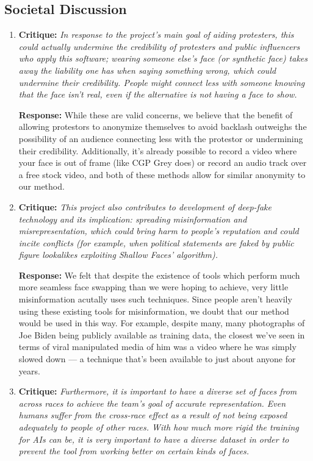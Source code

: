 \subsection{Societal Discussion}

\begin{enumerate}
    \item \textbf{Critique:} \textit{In response to the project’s main goal of aiding protesters, this could actually
    undermine the credibility of protesters and public influencers who apply this
    software; wearing someone else’s face (or synthetic face) takes away the liability
    one has when saying something wrong, which could undermine their credibility.
    People might connect less with someone knowing that the face isn’t real, even if
    the alternative is not having a face to show.}

    \textbf{Response:} While these are valid concerns, we believe that the benefit of allowing protestors to anonymize themselves
    to avoid backlash outweighs the possibility of an audience connecting less with the protestor or undermining their credibility. Additionally, it's already possible to record a video where your face is out of frame (like CGP Grey does) or record an audio track over a free stock video, and both of these methods allow for similar anonymity to our method.

    \item \textbf{Critique:} \textit{This project also contributes to development of deep-fake technology and its implication: spreading misinformation
    and misrepresentation, which could bring harm to people’s reputation and could incite conflicts (for example, when political statements are faked by public figure lookalikes exploiting Shallow Faces’ algorithm).}

    \textbf{Response:} We felt that despite the existence of tools which perform much more seamless face swapping than we were hoping to achieve, very little misinformation acutally uses such techniques. Since people aren't heavily using these existing tools for misinformation, we doubt that our method would be used in this way.
    For example, despite many, many photographs of Joe Biden being publicly available as training data, the closest we've seen in terms of viral manipulated media of him was a video where he was simply slowed down — a technique that's been available to just about anyone for years.

    \item \textbf{Critique:} \textit{Furthermore, it is important to have a diverse set of faces from across races to
    achieve the team’s goal of accurate representation. Even humans suffer from the cross-race effect as a result of not being exposed adequately to people of other
    races. With how much more rigid the training for AIs can be, it is very important
    to have a diverse dataset in order to prevent the tool from working better on certain
    kinds of faces.}


\end{enumerate}
